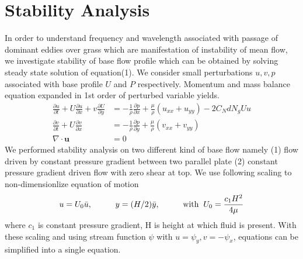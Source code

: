 \documentclass[aps,preprint,floatfix,prl]{revtex4-1}
\newcommand{\bu}{\mathbf{u}}
\newcommand{\del}{\partial}
\begin{document}
\section{Stability Analysis}
In order to understand frequency and wavelength associated with passage of dominant eddies over grass which are manifestation of instability of mean flow, 
we investigate stability of base flow profile which can be obtained by solving steady state solution of equation(1). We consider small perturbations $u, v, p$  associated 
with base profile $U$ and $P$ respectively. Momentum and mass balance equation expanded in 1st order of perturbed variable yields.
\begin{equation}
\begin{split}
 \frac{\del u}{\del t}+U\frac{\del u}{\del x}+v\frac{\del U}{\del y} &= -\frac{1}{\rho}\frac{\del p}{\del x}+\frac{\mu}{\rho}(u_{xx}+u_{yy})-2C_{N}dN_{g}Uu\\
 \frac{\del v}{\del  t}+ U\frac{\del v}{\del x} &= -\frac{1}{\rho}\frac{\del p}{\del y}+\frac{\mu}{\rho}(v_{xx}+v_{yy})\\
 \nabla\cdot \bu &= 0
\end{split}
\end{equation}
We performed stability analysis on two different kind of base flow namely (1) flow driven by constant pressure gradient between two parallel plate (2) constant pressure gradient driven 
flow with zero shear at top. We use following scaling to non-dimensionlize equation of motion
   \[ u = U_{0}\bar{u},\hspace{1cm} y = (H/2)\bar{y}, \hspace{1cm} \text{with}\hspace{2mm} U_{0}=\frac{c_{1}H^2}{4\mu} \]
where $c_{1}$ is constant pressure gradient, H is height at which fluid is present. With these scaling and using stream function $\psi$ with $u = \psi_{y}, v= -\psi_x$, equations 
can be simplified into a single equation.
\end{document}
